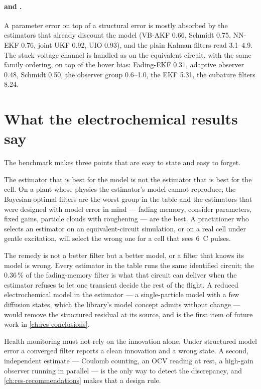 \paragraph{ and .} A parameter error on top of a
structural error is mostly absorbed by the estimators that already discount the model
(VB-AKF \num{0.66}, Schmidt \num{0.75}, NN-EKF \num{0.76}, joint UKF \num{0.92}, UIO
\num{0.93}), and the plain Kalman filters read \num{3.1}--\num{4.9}. The stuck voltage channel
is handled as on the equivalent circuit, with the same family ordering, on top of the hover
bias: Fading-EKF \num{0.31}, adaptive observer \num{0.48}, Schmidt \num{0.50}, the observer
group \num{0.6}--\num{1.0}, the EKF \num{5.31}, the cubature filters \num{8.24}.

\section{What the electrochemical results say}

The benchmark makes three points that are easy to state and easy to forget.

The estimator that is best for the model is not the estimator that is best for the cell. On
a plant whose physics the estimator's model cannot reproduce, the Bayesian-optimal filters
are the worst group in the table and the estimators that were designed with model error in
mind --- fading memory, consider parameters, fixed gains, particle clouds with roughening ---
are the best. A practitioner who selects an estimator on an equivalent-circuit simulation, or
on a real cell under gentle excitation, will select the wrong one for a cell that sees
\SI{6}{C} pulses.

The remedy is not a better filter but a better model, or a filter that knows its model is
wrong. Every estimator in the table runs the same identified circuit; the \num{0.36}\,\% of
the fading-memory filter is what that circuit can deliver when the estimator refuses to let
one transient decide the rest of the flight. A reduced electrochemical model in the estimator
--- a single-particle model with a few diffusion states, which the library's model concept
admits without change --- would remove the structured residual at its source, and is the
first item of future work in \cref{ch:res-conclusions}.

Health monitoring must not rely on the innovation alone. Under structured model error a
converged filter reports a clean innovation and a wrong state. A second, independent
estimate --- Coulomb counting, an OCV reading at rest, a high-gain observer running in
parallel --- is the only way to detect the discrepancy, and \cref{ch:res-recommendations}
makes that a design rule.
